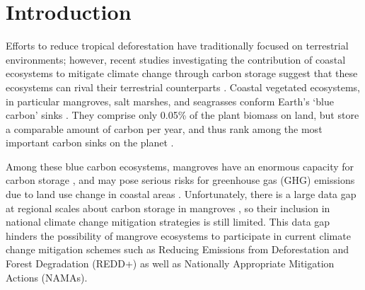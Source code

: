 \documentclass[review, authoryear]{elsarticle}   	%
\begin{document}
%

\linenumbers

\section{Introduction}

Efforts to reduce tropical deforestation have traditionally focused on terrestrial environments; however, recent studies investigating the contribution of coastal ecosystems to mitigate climate change through carbon storage suggest that these ecosystems can rival their terrestrial counterparts \citep{Donato2011}. Coastal vegetated ecosystems, in particular mangroves, salt marshes, and seagrasses conform Earth's `blue carbon' sinks \citep{Herr2012}. They comprise only  0.05\% of the plant biomass on land, but store a comparable amount of carbon per year, and thus rank among the most important carbon sinks on the planet \citep{Nellemann2009}. 


Among these blue carbon ecosystems, mangroves have an enormous capacity for carbon storage \citep{Nellemann2009, Donato2011, Adame2013}, and may pose serious risks for greenhouse gas (GHG) emissions due to land use change in coastal areas \citep{WorldBank2010}. Unfortunately, there is a large data gap at regional scales about carbon storage in mangroves \citep{Donato2011}, so their inclusion in national climate change mitigation strategies is still limited. This data gap hinders the possibility of mangrove ecosystems to participate in current climate change mitigation schemes such as Reducing Emissions from Deforestation and Forest Degradation (REDD+) as well as Nationally Appropriate Mitigation Actions (NAMAs)\citep{Alongi2011, Herr2012, Murray2012, Boucher2014}. %
\end{document}
